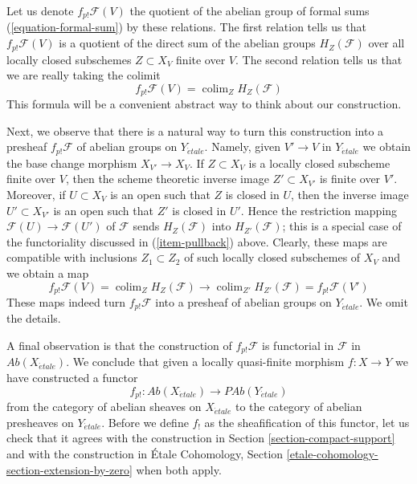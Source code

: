 \documentclass{stacks-project}
\theoremstyle{plain}
\theoremstyle{definition}
\theoremstyle{remark}
\numberwithin{equation}{subsection}
\def\colim{\mathop{\mathrm{colim}}\nolimits}
\def\etale{{\acute{e}tale}}
\begin{document}
\medskip\noindent
Let us denote $f_{p!}\mathcal{F}(V)$ the quotient of the abelian
group of formal sums (\ref{equation-formal-sum}) by these relations.
The first relation tells us that $f_{p!}\mathcal{F}(V)$ is a quotient
of the direct sum of the abelian groups $H_Z(\mathcal{F})$
over all locally closed subschemes $Z \subset X_V$ finite over $V$.
The second relation tells us that we are really taking the colimit
\begin{equation}
\label{equation-colimit-definition}
f_{p!}\mathcal{F}(V) = \colim_Z H_Z(\mathcal{F})
\end{equation}
This formula will be a convenient abstract way to think about
our construction.

\medskip\noindent
Next, we observe that there is a natural way to turn this construction
into a presheaf $f_{p!}\mathcal{F}$ of abelian groups on $Y_\etale$.
Namely, given $V' \to V$ in $Y_\etale$ we obtain the base change morphism
$X_{V'} \to X_V$. If $Z \subset X_V$ is a locally closed subscheme
finite over $V$, then the scheme theoretic inverse image $Z' \subset X_{V'}$
is finite over $V'$. Moreover, if $U \subset X_V$ is an open such
that $Z$ is closed in $U$, then the inverse image $U' \subset X_{V'}$
is an open such that $Z'$ is closed in $U'$. Hence the restriction
mapping $\mathcal{F}(U) \to \mathcal{F}(U')$ of $\mathcal{F}$
sends $H_Z(\mathcal{F})$ into $H_{Z'}(\mathcal{F})$; this is a special
case of the functoriality discussed in (\ref{item-pullback}) above.
Clearly, these maps are compatible with inclusions
$Z_1 \subset Z_2$ of such locally closed subschemes of $X_V$ and
we obtain a map
$$
f_{p!}\mathcal{F}(V) = \colim_Z H_Z(\mathcal{F})
\longrightarrow
\colim_{Z'} H_{Z'}(\mathcal{F}) =
f_{p!}\mathcal{F}(V')
$$
These maps indeed turn $f_{p!}\mathcal{F}$ into a presheaf of abelian
groups on $Y_\etale$. We omit the details.

\medskip\noindent
A final observation is that the construction of $f_{p!}\mathcal{F}$
is functorial in $\mathcal{F}$ in $\textit{Ab}(X_\etale)$.
We conclude that given a locally quasi-finite morphism $f : X \to Y$
we have constructed a functor
$$
f_{p!} :
\textit{Ab}(X_\etale)
\longrightarrow
\textit{PAb}(Y_\etale)
$$
from the category of abelian sheaves on $X_\etale$ to the category
of abelian presheaves on $Y_\etale$. Before we define $f_!$ as the
sheafification of this functor, let us check that it agrees with
the construction in Section \ref{section-compact-support}
and with the construction in
\'Etale Cohomology, Section \ref{etale-cohomology-section-extension-by-zero}
when both apply.
\end{document}
